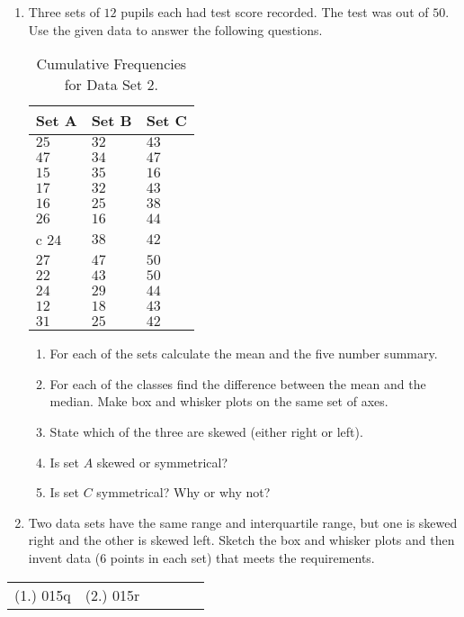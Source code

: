{
\begin{enumerate}
\item Three sets of $12$ pupils each had test score recorded. The test was out of $50$. Use the given data to answer the following questions.
\begin{table}[htb]
\begin{center}
\begin{tabular}{|l|l|l|}
\hline
Set A & Set B & Set C \bigstrut \\ 
\hline
$25$ & $32$ & $43$ \\
$47$ & $34$ & $47$ \\
$15$ & $35$ & $16$ \\
$17$ & $32$ & $43$ \\
$16$ & $25$ & $38$ \\
$26$ & $16$ & $44$ \\c
$24$ & $38$ & $42$ \\
$27$ & $47$ & $50$ \\
$22$ & $43$ & $50$ \\
$24$ & $29$ & $44$ \\
$12$ & $18$ & $43$ \\
$31$ & $25$ & $42 $\\
\hline
\end{tabular}
\caption{Cumulative Frequencies for Data Set 2. \label{tab:mdat:s:cumulativeds2}}
\end{center}
\end{table}
\begin{enumerate}
\item For each of the sets calculate the mean and the five number summary.
\item For each of the classes find the difference between the mean and the median. Make box and whisker plots on the same set of axes.
\item State which of the three are skewed (either right or left).
\item Is set $A$ skewed or symmetrical? 
\item Is set $C$ symmetrical? Why or why not?
\end{enumerate}
\item Two data sets have the same range and interquartile range, but one is skewed right and the other is skewed left. Sketch the box and whisker plots and then invent data ($6$ points in each set) that meets the requirements.
\end{enumerate}


\par \practiceinfo
\par \begin{tabular}[h]{cccccc}
(1.)	015q	&
(2.)	015r	&
\end{tabular}}

